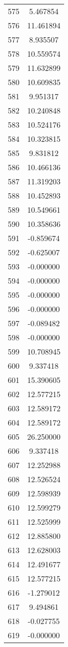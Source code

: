 \documentclass[12pt]{article}
\begin{document}
\begin{longtable}{@{}cc@{}}
575 & 5.467854 \\
576 & 11.461894 \\
577 & 8.935507 \\
578 & 10.559574 \\
579 & 11.632899 \\
580 & 10.609835 \\
581 & 9.951317 \\
582 & 10.240848 \\
583 & 10.524176 \\
584 & 10.323815 \\
585 & 9.831812 \\
586 & 10.466136 \\
587 & 11.319203 \\
588 & 10.452893 \\
589 & 10.549661 \\
590 & 10.358636 \\
591 & -0.859674 \\
592 & -0.625007 \\
593 & -0.000000 \\
594 & -0.000000 \\
595 & -0.000000 \\
596 & -0.000000 \\
597 & -0.089482 \\
598 & -0.000000 \\
599 & 10.708945 \\
600 & 9.337418 \\
601 & 15.390605 \\
602 & 12.577215 \\
603 & 12.589172 \\
604 & 12.589172 \\
605 & 26.250000 \\
606 & 9.337418 \\
607 & 12.252988 \\
608 & 12.526524 \\
609 & 12.598939 \\
610 & 12.599279 \\
611 & 12.525999 \\
612 & 12.885800 \\
613 & 12.628003 \\
614 & 12.491677 \\
615 & 12.577215 \\
616 & -1.279012 \\
617 & 9.494861 \\
618 & -0.027755 \\
619 & -0.000000 \\

\end{longtable}
\end{document}
